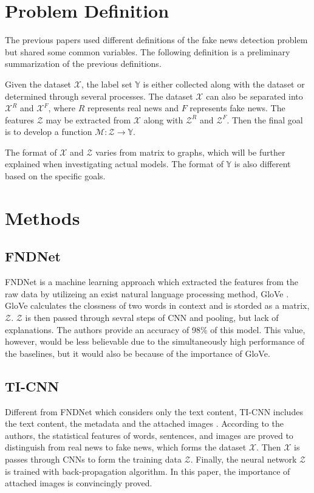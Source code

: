 \documentclass[sigconf ,nonacm]{acmart}
\begin{document}
\section{Problem Definition}
The previous papers used different definitions of the fake news detection problem but shared some common variables. The following definition is a preliminary summarization of the previous definitions.

Given the dataset $\mathcal{X}$, the label set $\mathbb{Y}$ is either collected along with the dataset or determined through several processes. The dataset $\mathcal{X}$ can also be separated into $\mathcal{X}^R$ and $\mathcal{X}^F$, where $R$ represents real news and $F$ represents fake news. The features $\mathcal{Z}$ may be extracted from $\mathcal{X}$ along with $\mathcal{Z}^R$ and $\mathcal{Z}^F$. Then the final goal is to develop a function $\mathcal{M}:\mathcal{Z} \to \mathbb{Y}$.

The format of $\mathcal{X}$ and $\mathcal{Z}$ varies from matrix to graphs, which will be further explained when investigating actual models. The format of $\mathbb{Y}$ is also different based on the specific goals.

\section{Methods}

\subsection{FNDNet}
FNDNet \cite{FNDNet} is a machine learning approach which extracted the features from the raw data by utilizeing an exist natural language processing method, GloVe \cite{glove}. GloVe calculates the clossness of two words in context and is storded as a matrix, $\mathcal{Z}$. $\mathcal{Z}$ is then passed through sevral steps of CNN and pooling, but lack of explanations. The authors provide an accuracy of 98\% of this model. This value, however, would be less believable due to the simultaneously high performance of the baselines, but it would also be because of the importance of GloVe.

\subsection{TI-CNN}
Different from FNDNet which considers only the text content, TI-CNN includes the text content, the metadata and the attached images \cite{yang2018ti}. According to the authors, the statistical features of words, sentences, and images are proved to distinguish from real news to fake news, which forms the dataset $\mathcal{X}$. Then $\mathcal{X}$ is passes through CNNs to form the training data $\mathcal{Z}$. Finally, the neural network $\mathcal{Z}$ is trained with back-propagation algorithm. In this paper, the importance of attached images is convincingly proved.
\end{document}
